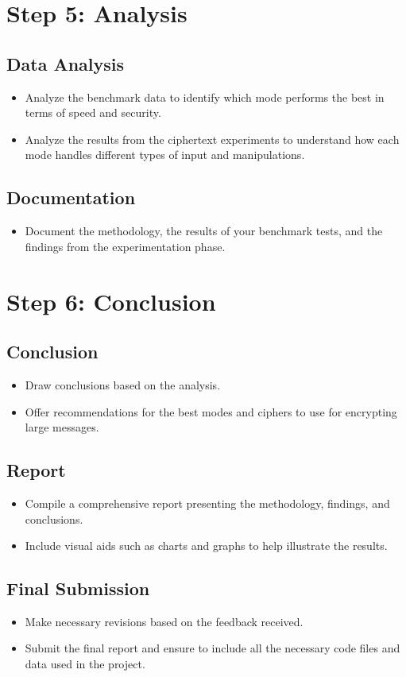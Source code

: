 \documentclass{exam}
\begin{document}
  \section*{Step 5: Analysis}

  \subsection*{Data Analysis}
  \begin{itemize}
      \item Analyze the benchmark data to identify which mode performs the best in terms of speed and security.
      \item Analyze the results from the ciphertext experiments to understand how each mode handles different types of input and manipulations.
  \end{itemize}

  \subsection*{Documentation}
  \begin{itemize}
      \item Document the methodology, the results of your benchmark tests, and the findings from the experimentation phase.
  \end{itemize}

  \section*{Step 6: Conclusion}

  \subsection*{Conclusion}
  \begin{itemize}
      \item Draw conclusions based on the analysis.
      \item Offer recommendations for the best modes and ciphers to use for encrypting large messages.
  \end{itemize}

  \subsection*{Report}
  \begin{itemize}
      \item Compile a comprehensive report presenting the methodology, findings, and conclusions.
      \item Include visual aids such as charts and graphs to help illustrate the results.
  \end{itemize}

  \subsection*{Final Submission}
  \begin{itemize}
      \item Make necessary revisions based on the feedback received.
      \item Submit the final report and ensure to include all the necessary code files and data used in the project.
  \end{itemize}
\end{document}
